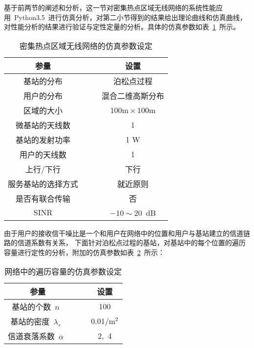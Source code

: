 基于前两节的阐述和分析，这一节对密集热点区域无线网络的系统性能应用~Python3.5~进行仿真分析，对第二小节得到的结果给出理论曲线和仿真曲线，
对性能分析的结果进行验证与定性定量的分析。具体的仿真参数如表~\ref{pc_sim_para}~所示。
\begin{table}[htbp]
\caption{密集热点区域无线网络的仿真参数设定}
\label{pc_sim_para}
\vspace{0.5em}\centering\wuhao
\begin{tabular}{cccc}
\toprule[1.5pt]
参量 & & & 设置 \\
\midrule[0.5pt]
基站的分布 & & & 泊松点过程 \\
用户的分布  & & & 混合二维高斯分布\\
区域的大小  & & & ~$100\mathrm{m} \times 100 \mathrm{m}$~ \\
微基站的天线数 & & & 1 \\
基站的发射功率 & & & 1 $\mathrm{W}$ \\
用户的天线数 & & & 1 \\
上行/下行 & & & 下行 \\
服务基站的选择方式 & & & 就近原则 \\
是否有联合传输 & & & 否\\
$\mathrm{SINR}$ & & & $-10 \sim 20$~dB \\
\bottomrule[1.5pt]
\end{tabular}
\end{table}
由于用户的接收信干噪比是一个和用户在网络中的位置和用户与基站建立的信道链路的信道系数有关系，
下面针对泊松点过程的基站，对基站中的每个位置的遍历容量进行定性的分析，附加的仿真参数如表~\ref{sinr_sim_para}~所示：
\begin{table}[htbp]
\caption{网络中的遍历容量的仿真参数设定}
\label{sinr_sim_para}
\vspace{0.5em}\centering\wuhao
\begin{tabular}{cccc}
\toprule[1.5pt]
参量 & & & 设置 \\
\midrule[0.5pt]
基站的个数~$n$~ & & &  100\\
基站的密度~$\lambda_s$~ & & &  0.01/${\mathrm{m}^2}$\\
信道衰落系数~$\alpha$~  & & & 2,~4\\
\bottomrule[1.5pt]
\end{tabular}
\end{table}

